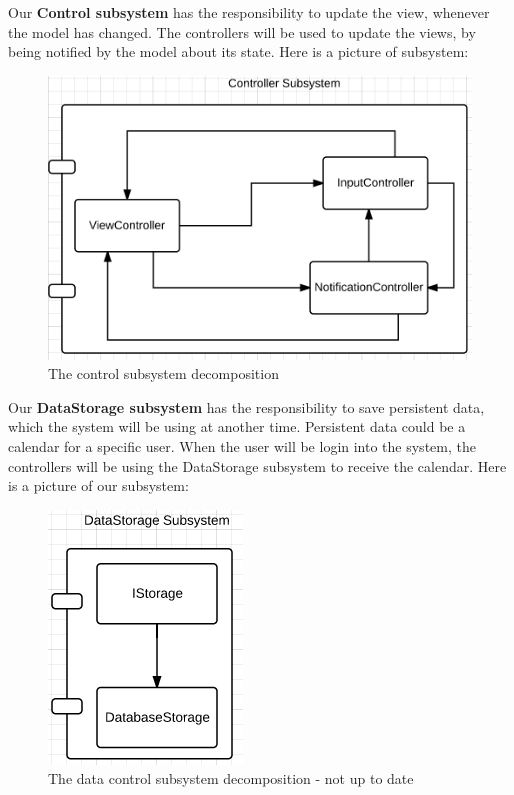 Our \textbf{Control subsystem} has the responsibility to update the view, whenever the model has changed. The controllers will be used to update the views, by being notified by the model about its state. Here is a picture of subsystem:\\
\begin{figure}[h!]
	\centering
		\includegraphics[scale=0.8]{controlSubsystem}
	\caption{The control subsystem decomposition}
  \label{fig:ControlSubsystemDecomposition}
\end{figure}

\pagebreak

Our \textbf{DataStorage subsystem} has the responsibility to save persistent data, which the system will be using at another time. Persistent data could be a calendar for a specific user. When the user will be login into the system, the controllers will be using the DataStorage subsystem to receive the calendar. Here is a picture of our subsystem:\\
\begin{figure}[h!]
	\centering
		\includegraphics[scale=0.8]{datastorageSubsystem}
	\caption{The data control subsystem decomposition - not up to date}
  \label{fig:DataStorageSubsystemDecomposition}
\end{figure}
\newpage